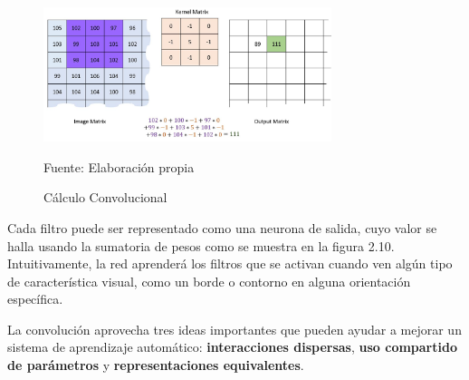 		\begin{figure}[H]
		\begin{center}
		\includegraphics[width=0.75\textwidth]{images/marcoteorico/Convolution_calculation2}
		\end{center}
		\begin{center}
		\caption{\small{Cálculo Convolucional}}
		{\small{Fuente: Elaboración propia}}
		\end{center}
		\vspace{-1.9em}
		\end{figure}

		Cada filtro puede ser representado como una neurona de salida, cuyo valor se halla usando la sumatoria de pesos como se muestra en la figura 2.10. Intuitivamente, la red aprenderá los filtros que se activan cuando ven algún tipo de característica visual, como un borde o contorno en alguna orientación específica. 
		
		\vskip 0.4cm  
		
		La convolución aprovecha tres ideas importantes que pueden ayudar a mejorar un sistema de aprendizaje automático: {\bf interacciones dispersas}, {\bf uso compartido de parámetros} y {\bf representaciones equivalentes}.
		
